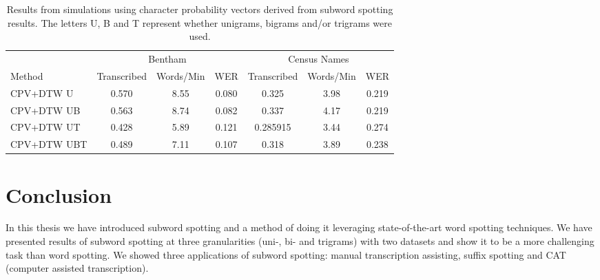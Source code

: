 \documentclass[ms,electronic,twosidetoc,letterpaper,chaptercenter,parttop,lof,lot]{byumsphd}
\begin{document}
\begin{table}
\centering
\begin{tabular}{| l | c c c | c c c |}
  \hline
   & \multicolumn{3}{c|}{Bentham} & \multicolumn{3}{c|}{Census Names}\\
  Method & Transcribed & Words/Min & WER & Transcribed & Words/Min & WER\\
  \hline
  CPV+DTW U & 0.570 & 8.55 & 0.080 & 0.325 & 3.98 & 0.219  \\
  CPV+DTW UB & 0.563 & 8.74 & 0.082 & 0.337 & 4.17 & 0.219  \\
  CPV+DTW UT	 & 0.428 & 5.89 & 0.121 & 0.285915 & 3.44 & 0.274  \\
  CPV+DTW UBT & 0.489 & 7.11 & 0.107 & 0.318 & 3.89 & 0.238  \\
  \hline    
\end{tabular}
\caption{Results from simulations using character probability vectors derived from subword spotting results. The letters U, B and T represent whether unigrams, bigrams and/or trigrams were used.}
\label{tab:dtwresults}
\end{table}





\chapter{Conclusion}

In this thesis we have introduced subword spotting and a method of doing it leveraging state-of-the-art word spotting techniques. We have presented results of subword spotting at three granularities (uni-, bi- and trigrams) with two datasets and show it to be a more challenging task than word spotting. We showed three applications of subword spotting: manual transcription assisting, suffix spotting and CAT (computer assisted transcription).
\end{document}
